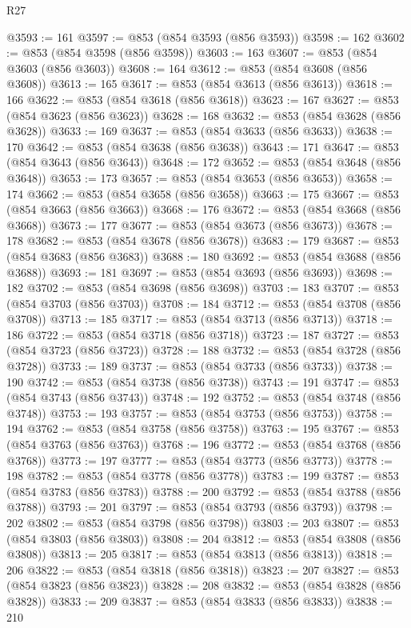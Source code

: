 \begin{lexlean}{R27}
\begin{coremodule}
@3593 := 161
@3597 := @853 (@854 @3593 (@856 @3593))
@3598 := 162
@3602 := @853 (@854 @3598 (@856 @3598))
@3603 := 163
@3607 := @853 (@854 @3603 (@856 @3603))
@3608 := 164
@3612 := @853 (@854 @3608 (@856 @3608))
@3613 := 165
@3617 := @853 (@854 @3613 (@856 @3613))
@3618 := 166
@3622 := @853 (@854 @3618 (@856 @3618))
@3623 := 167
@3627 := @853 (@854 @3623 (@856 @3623))
@3628 := 168
@3632 := @853 (@854 @3628 (@856 @3628))
@3633 := 169
@3637 := @853 (@854 @3633 (@856 @3633))
@3638 := 170
@3642 := @853 (@854 @3638 (@856 @3638))
@3643 := 171
@3647 := @853 (@854 @3643 (@856 @3643))
@3648 := 172
@3652 := @853 (@854 @3648 (@856 @3648))
@3653 := 173
@3657 := @853 (@854 @3653 (@856 @3653))
@3658 := 174
@3662 := @853 (@854 @3658 (@856 @3658))
@3663 := 175
@3667 := @853 (@854 @3663 (@856 @3663))
@3668 := 176
@3672 := @853 (@854 @3668 (@856 @3668))
@3673 := 177
@3677 := @853 (@854 @3673 (@856 @3673))
@3678 := 178
@3682 := @853 (@854 @3678 (@856 @3678))
@3683 := 179
@3687 := @853 (@854 @3683 (@856 @3683))
@3688 := 180
@3692 := @853 (@854 @3688 (@856 @3688))
@3693 := 181
@3697 := @853 (@854 @3693 (@856 @3693))
@3698 := 182
@3702 := @853 (@854 @3698 (@856 @3698))
@3703 := 183
@3707 := @853 (@854 @3703 (@856 @3703))
@3708 := 184
@3712 := @853 (@854 @3708 (@856 @3708))
@3713 := 185
@3717 := @853 (@854 @3713 (@856 @3713))
@3718 := 186
@3722 := @853 (@854 @3718 (@856 @3718))
@3723 := 187
@3727 := @853 (@854 @3723 (@856 @3723))
@3728 := 188
@3732 := @853 (@854 @3728 (@856 @3728))
@3733 := 189
@3737 := @853 (@854 @3733 (@856 @3733))
@3738 := 190
@3742 := @853 (@854 @3738 (@856 @3738))
@3743 := 191
@3747 := @853 (@854 @3743 (@856 @3743))
@3748 := 192
@3752 := @853 (@854 @3748 (@856 @3748))
@3753 := 193
@3757 := @853 (@854 @3753 (@856 @3753))
@3758 := 194
@3762 := @853 (@854 @3758 (@856 @3758))
@3763 := 195
@3767 := @853 (@854 @3763 (@856 @3763))
@3768 := 196
@3772 := @853 (@854 @3768 (@856 @3768))
@3773 := 197
@3777 := @853 (@854 @3773 (@856 @3773))
@3778 := 198
@3782 := @853 (@854 @3778 (@856 @3778))
@3783 := 199
@3787 := @853 (@854 @3783 (@856 @3783))
@3788 := 200
@3792 := @853 (@854 @3788 (@856 @3788))
@3793 := 201
@3797 := @853 (@854 @3793 (@856 @3793))
@3798 := 202
@3802 := @853 (@854 @3798 (@856 @3798))
@3803 := 203
@3807 := @853 (@854 @3803 (@856 @3803))
@3808 := 204
@3812 := @853 (@854 @3808 (@856 @3808))
@3813 := 205
@3817 := @853 (@854 @3813 (@856 @3813))
@3818 := 206
@3822 := @853 (@854 @3818 (@856 @3818))
@3823 := 207
@3827 := @853 (@854 @3823 (@856 @3823))
@3828 := 208
@3832 := @853 (@854 @3828 (@856 @3828))
@3833 := 209
@3837 := @853 (@854 @3833 (@856 @3833))
@3838 := 210

\end{coremodule}
\end{lexlean}
